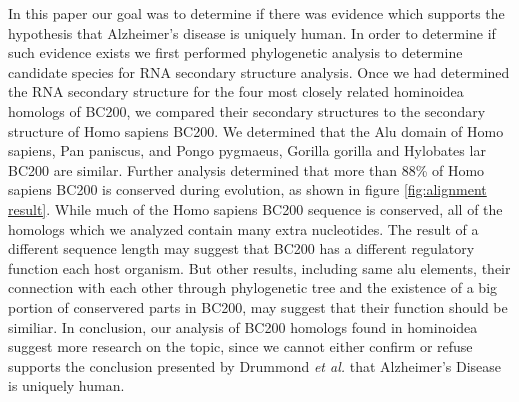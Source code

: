 \documentclass[conference, 11pt]{IEEEtran}
\begin{document}
In this paper our goal was to determine if there was evidence which supports the hypothesis that Alzheimer’s disease is uniquely human. In order to determine if such evidence exists we first performed phylogenetic analysis to determine candidate species for RNA secondary structure analysis. Once we had determined the RNA secondary structure for the four most closely related hominoidea homologs of BC200, we compared their secondary structures to the secondary structure of Homo sapiens BC200. We determined that the Alu domain of Homo sapiens, Pan paniscus, and Pongo pygmaeus, Gorilla gorilla and Hylobates lar BC200 are similar. Further analysis determined that more than 88\% of Homo sapiens BC200 is conserved during evolution, as shown in figure \ref{fig:alignment result}. While much of the Homo sapiens BC200 sequence is conserved, all of the homologs which we analyzed contain many extra nucleotides. The result of a different sequence length may suggest that BC200 has a different regulatory function each host organism. But other results, including same alu elements, their connection with each other through phylogenetic tree and the existence of a big portion of conservered parts in BC200, may suggest that their function should be similiar. In conclusion, our analysis of BC200 homologs found in hominoidea suggest more research on the topic, since we cannot either confirm or refuse supports the conclusion presented by Drummond \emph{et al.} that Alzheimer’s Disease is uniquely human.



\end{document}
